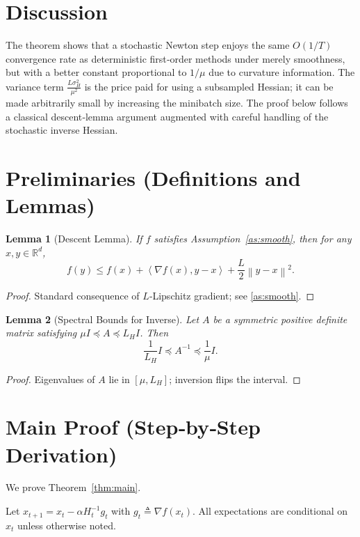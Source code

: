 \documentclass{article}
\newtheorem{lemma}{Lemma}
\newcommand{\R}{\mathbb{R}}
\newcommand{\norm}[1]{\left\|#1\right\|}
\newcommand{\ip}[2]{\left\langle #1,#2\right\rangle}
\newcommand{\grad}{\nabla}
\begin{document}
\section*{Discussion}
The theorem shows that a stochastic Newton step enjoys the same $O(1/T)$ convergence rate as deterministic first‑order methods under merely smoothness, but with a better constant proportional to $1/\mu$ due to curvature information. The variance term $\frac{L\sigma_H^2}{\mu^2}$ is the price paid for using a subsampled Hessian; it can be made arbitrarily small by increasing the minibatch size. The proof below follows a classical descent‑lemma argument augmented with careful handling of the stochastic inverse Hessian.

\newpage
\section*{Preliminaries (Definitions and Lemmas)}
\begin{lemma}[Descent Lemma]\label{lem:descent}
If $f$ satisfies Assumption~\ref{as:smooth}, then for any $x,y\in\R^d$,
\[
    f(y)\le f(x)+\ip{\grad f(x)}{y-x}+\frac{L}{2}\norm{y-x}^2 .
\tag{8}
\]
\end{lemma}
\begin{proof}
Standard consequence of $L$‑Lipschitz gradient; see \eqref{as:smooth}. \qedhere
\end{proof}

\begin{lemma}[Spectral Bounds for Inverse]\label{lem:inv}
Let $A$ be a symmetric positive definite matrix satisfying $\mu I\preceq A\preceq L_H I$. Then
\[
    \frac{1}{L_H} I \preceq A^{-1}\preceq \frac{1}{\mu} I .
\tag{9}
\]
\end{lemma}
\begin{proof}
Eigenvalues of $A$ lie in $[\mu,L_H]$; inversion flips the interval. \qedhere
\end{proof}

\section*{Main Proof (Step‑by‑Step Derivation)}
We prove Theorem~\ref{thm:main}.  

Let $x_{t+1}=x_t-\alpha H_t^{-1}g_t$ with $g_t\triangleq\grad f(x_t)$.  
All expectations are conditional on $x_t$ unless otherwise noted.
\end{document}
